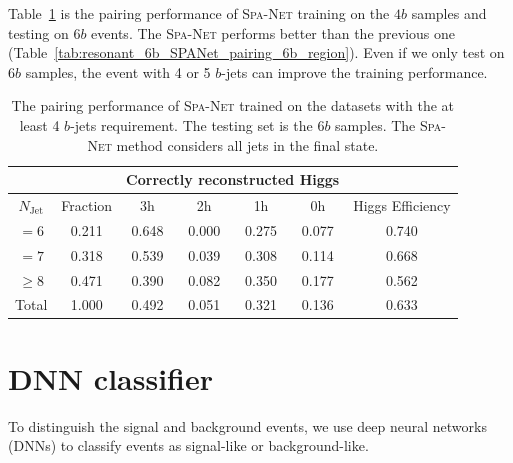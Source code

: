 \documentclass[12pt]{article}
\begin{document}
    Table~\ref{tab:resonant_4b_SPANet_pairing_6b_region} is the pairing performance of \textsc{Spa-Net} training on the $4b$ samples and testing on $6b$ events. The \textsc{Spa-Net} performs better than the previous one (Table~\ref{tab:resonant_6b_SPANet_pairing_6b_region}). Even if we only test on $6b$ samples, the event with 4 or 5 $b$-jets can improve the training performance.
    \begin{table}[htpb]
        \centering
        \caption{The pairing performance of \textsc{Spa-Net} trained on the datasets with the at least 4 $b$-jets requirement. The testing set is the $6b$ samples. The \textsc{Spa-Net} method considers all jets in the final state.}
        \label{tab:resonant_4b_SPANet_pairing_6b_region}
        \begin{tabular}{c|c|cccc|c}
            \multicolumn{1}{l|}{} &          & \multicolumn{4}{c|}{Correctly reconstructed Higgs} & \multicolumn{1}{l}{} \\ \hline
            $N_\text{Jet}$        & Fraction & 3h          & 2h         & 1h         & 0h         & Higgs Efficiency     \\ \hline
            $=6$                  & 0.211 & 0.648 & 0.000 & 0.275 & 0.077 & 0.740 \\
            $=7$                  & 0.318 & 0.539 & 0.039 & 0.308 & 0.114 & 0.668 \\
            $\ge 8$               & 0.471 & 0.390 & 0.082 & 0.350 & 0.177 & 0.562 \\ \hline
            Total                 & 1.000 & 0.492 & 0.051 & 0.321 & 0.136 & 0.633
        \end{tabular}
    \end{table}
\section{DNN classifier}%
\label{sec:dnn_classifier}
    To distinguish the signal and background events, we use deep neural networks (DNNs) to classify events as signal-like or background-like.
\end{document}
